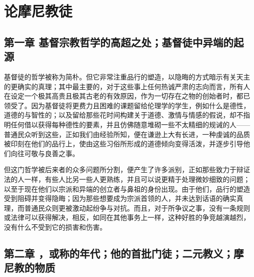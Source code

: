 
\chapter{论摩尼教徒}



\section{第一章 基督宗教哲学的高超之处；基督徒中异端的起源}

基督徒的哲学被称为简朴。但它非常注重品行的塑造，以隐晦的方式暗示有关天主的更确实的真理；其中最主要的，对于这些事上任何热诚严肃的志向而言，所有人在设定一个极其高贵且极其古老的有效原因，作为一切存在之物的创始者时，都已领受了。因为基督徒将更费力且困难的课题留给伦理学的学生，例如什么是德性，道德的与智性的；以及留给那些花时间构建关于道德、激情与情感的假说，却不指明任何借以获得每种德性的要素，并且仿佛随意堆砌一些不太精细的规诫的人——普通民众听到这些，正如我们由经验所知，便在谦逊上大有长进，一种虔诚的品质被印刻在他们的品行上，使由这些习俗所形成的道德倾向变得活泼，并逐步引导他们向往可敬与良善之事。\par

但这门哲学被后来者的众多问题所分割，便产生了许多派别，正如那些致力于辩证法的人一样，有些人比另一些人更熟练，并且可以说更精于处理微妙细致的问题；以至于现在他们以宗派和异端的创立者与鼻祖的身份出现。由于他们，品行的塑造受到阻碍并变得隐晦；因为那些想要成为宗派首领的人，并未达到话语的确实真理，而普通民众则更被激动起纷争与对抗。而且，对于所争议之事，没有一条规则或法律可以获得解决，相反，如同在其他事务上一样，这种好胜的争竞越演越烈，没有什么不受到它的损害和伤害。\par


\section{第二章 ，或称的年代；他的首批门徒；二元教义；摩尼教的物质}

